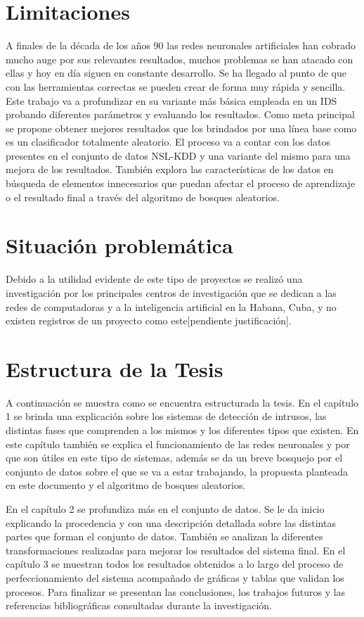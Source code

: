 \section*{Limitaciones}
A finales de la década de los años 90 las redes neuronales artificiales han cobrado mucho auge por sus relevantes resultados, muchos problemas se han atacado con ellas y hoy en día siguen en constante desarrollo. Se ha llegado al punto de que con las herramientas correctas se pueden crear de forma muy rápida y sencilla. Este trabajo va a profundizar en su variante más básica empleada en un IDS probando diferentes parámetros y evaluando los resultados. Como meta principal se propone obtener mejores resultados que los brindados por una línea base como es un clasificador totalmente aleatorio. El proceso va a contar con los datos presentes en el conjunto de datos NSL-KDD y una variante del mismo para una mejora de los resultados. También explora las características de los datos en búsqueda de elementos innecesarios que puedan afectar el proceso de aprendizaje o el resultado final a través del algoritmo de bosques aleatorios.

\section*{Situación problemática}
Debido a la utilidad evidente de este tipo de proyectos se realizó una investigación por los principales centros de investigación que se dedican a las redes de computadoras y a la inteligencia artificial en la Habana, Cuba, y no existen registros de un proyecto como este[pendiente justificación]. 

\section*{Estructura de la Tesis}
A continuación se muestra como se encuentra estructurada la tesis. En el capítulo 1 se brinda una explicación sobre los sistemas de detección de intrusos, las distintas fases que comprenden a los mismos y los diferentes tipos que existen. En este capítulo también se explica el funcionamiento de las redes neuronales y por que son útiles en este tipo de sistemas, además se da un breve bosquejo por el conjunto de datos sobre el que se va a estar trabajando, la propuesta planteada en este documento y el algoritmo de bosques aleatorios.

En el capítulo 2 se profundiza más en el conjunto de datos. Se le da inicio  explicando la procedencia y con una descripción detallada sobre las distintas partes que forman el conjunto de datos. También se analizan la diferentes transformaciones realizadas para mejorar los resultados del sistema final. En el capítulo 3 se muestran todos los resultados obtenidos a lo largo del proceso de perfeccionamiento del sistema acompañado de gráficas y tablas que validan los procesos. Para finalizar se presentan las conclusiones, los trabajos futuros y las referencias bibliográficas consultadas durante la investigación.

